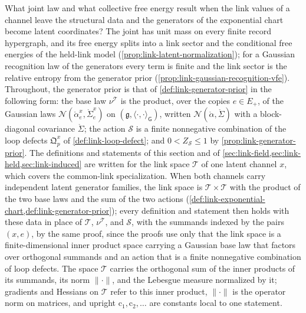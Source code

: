 What joint law and what collective free energy result when the link values of a channel leave the
structural data and the generators of the exponential chart become latent coordinates? The joint has
unit mass on every finite record hypergraph, and its free energy splits into a link sector and the
conditional free energies of the held-link model (\cref{prop:link-latent-normalization}); for a Gaussian
recognition law of the generators every term is finite and the link sector is the relative entropy from
the generator prior (\cref{prop:link-gaussian-recognition-vfe}). Throughout, the generator prior is that
of \cref{def:link-generator-prior} in the following form: the base law $\nu^{\mathscr T}$ is the product,
over the copies $e\in E_+$, of the Gaussian laws
$\mathcal N(\mathring\alpha^x_e,\mathring\Sigma^x_e)$ on $(\mathfrak g,\langle\cdot,\cdot\rangle_{\mathsf G})$,
written $\mathcal N(\mathring\alpha,\mathring\Sigma)$ with a block-diagonal covariance $\mathring\Sigma$; the
action $\mathscr S$ is a finite nonnegative combination of the loop defects $\mathfrak Q^x_p$ of
\cref{def:link-loop-defect}; and $0<Z_{\mathscr S}\leq1$ by \cref{prop:link-generator-prior}. The
definitions and statements of this section and of \cref{sec:link-field,sec:link-held,sec:link-induced} are
written for the link space $\mathscr T$ of one latent channel $x$, which covers the common-link
specialization. When both channels carry independent latent generator families, the link space is
$\mathscr T\times\mathscr T$ with the product of the two base laws and the sum of the two actions
(\cref{def:link-exponential-chart,def:link-generator-prior}); every definition and statement then holds with
these data in place of $\mathscr T$, $\nu^{\mathscr T}$, and $\mathscr S$, with the summands indexed by the
pairs $(x,e)$, by the same proof, since the proofs use only that the link space is a finite-dimensional
inner product space carrying a Gaussian base law that factors over orthogonal summands and an action that
is a finite nonnegative combination of loop defects. The space
$\mathscr T$ carries the orthogonal sum of the inner products of its summands, its norm
$\lVert\cdot\rVert$, and the Lebesgue measure normalized by it; gradients and Hessians on $\mathscr T$
refer to this inner product, $\lVert\cdot\rVert$ is the operator norm on matrices, and upright
$\mathrm c_1,\mathrm c_2,\ldots$ are constants local to one statement.

